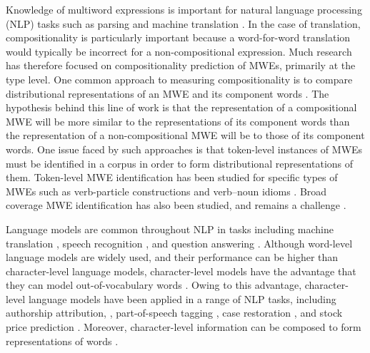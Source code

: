\documentclass[11pt]{article}
\begin{document}


Knowledge of multiword expressions is important for natural language
processing (NLP) tasks such as parsing
\citep{Korkontzelos:Manandhar:2010} and machine translation
\citep{Carpuat:Diab:2010}. In the case of translation,
compositionality is particularly important because a word-for-word
translation would typically be incorrect for a non-compositional
expression. Much research has therefore focused on compositionality
prediction of MWEs, primarily at the type level. One common approach
to measuring compositionality is to compare distributional
representations of an MWE and its component words
\citep[e.g.,][]{Schone:Jurafsky:2001,Baldwin+:2003,Katz2006,reddy2011empirical,SchulteImWalde+:2013,Salehi+:2015}. The
hypothesis behind this line of work is that the representation of a
compositional MWE will be more similar to the representations of its
component words than the representation of a non-compositional MWE
will be to those of its component words. One issue faced by such
approaches is that token-level instances of MWEs must be identified in
a corpus in order to form distributional representations of
them. Token-level MWE identification has been studied for specific
types of MWEs such as verb-particle constructions
\citep[e.g.,][]{Kim:Baldwin:2010} and verb--noun idioms
\citep[e.g.,][]{salton-ross-kelleher}. Broad coverage MWE
identification has also been studied, and remains a challenge
\citep{Schneider+:2014,gharbieh+:2017}.



Language models are common throughout NLP in tasks including machine
translation \citep{brants2007large}, speech recognition
\citep{collins2005discriminative}, and question answering
\citep{chen2006reranking}. Although word-level language models are
widely used, and their performance can be higher than character-level
language models, character-level models have the advantage that they
can model out-of-vocabulary words \citep{mikolov2012subword}. Owing to
this advantage, character-level language models have been applied in a
range of NLP tasks, including authorship attribution,
\citep{peng2003language}, part-of-speech tagging
\citep{santos2014learning}, case restoration
\citep{susanto2016learning}, and stock price prediction
\citep{dos2017stock}. Moreover, character-level information can be
composed to form representations of words \citep{Ling+:2015}.
\end{document}
